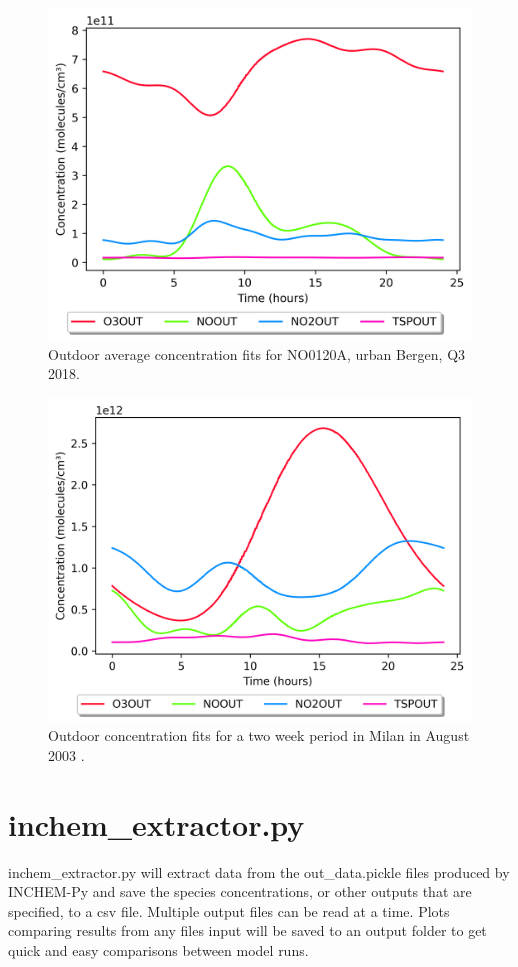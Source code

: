 \documentclass[a4paper]{refart}
\begin{document}
\begin{figure}[h!]
    \centering
    \includegraphics[width=\textwidth]{Bergen_urban.png}
    \caption{Outdoor average concentration fits for NO0120A, urban Bergen, Q3 2018.}
    \label{fig:Out_berg_urb}
\end{figure}
\begin{figure}[h!]
    \centering
    \includegraphics[width=\textwidth]{Milan_Aug2003.png}
    \caption{Outdoor concentration fits for a two week period in Milan in August 2003 \cite{Terry2014}.}
    \label{fig:Milan}
\end{figure}

\clearpage
\section{inchem\_extractor.py}\label{inchem_extractor.py}
inchem\_extractor.py will extract data from the out\_data.pickle files produced by INCHEM-Py and save the species concentrations, or other outputs that are specified, to a csv file. Multiple output files can be read at a time. Plots comparing results from any files input will be saved to an output folder to get quick and easy comparisons between model runs.
\end{document}
